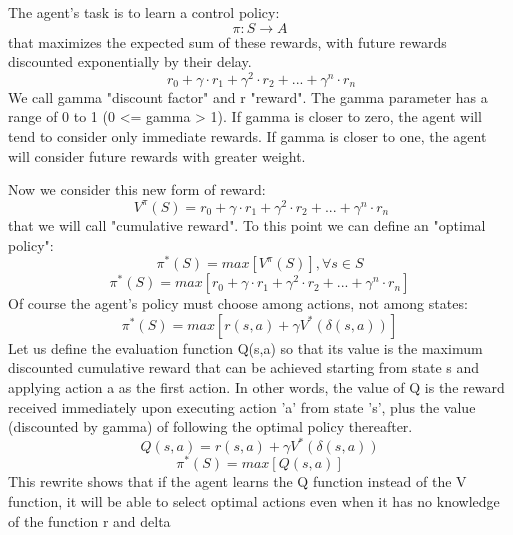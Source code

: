 \documentclass[a4paper]{article}
\begin{document}
The agent's task is to learn a control policy:
\begin{equation}
\pi : S \rightarrow A
\end{equation}
that maximizes the expected sum of these rewards, with future rewards discounted exponentially by their delay.
\begin{equation}
\ r_{0}+\gamma\cdot r_{1}+\gamma^{2}\cdot r_{2}+ ... +\gamma^{n}\cdot r_{n}
\end{equation}
We call gamma "discount factor" and r "reward". 
The gamma parameter has a range of 0 to 1 (0 <= gamma > 1). If gamma is closer to zero, the agent will tend to consider only immediate rewards. If gamma is closer to one, the agent will consider future rewards with greater weight.

Now we consider this new form of reward:
\begin{equation}
\ V^{\pi}(S)=r_{0}+\gamma\cdot r_{1}+\gamma^{2}\cdot r_{2}+ ... +\gamma^{n}\cdot r_{n}
\end{equation}
that we will call "cumulative reward". To this point we can define an "optimal policy":
\begin{equation}
\pi^{*}(S)=max[ V^{\pi}(S)], \forall s \in S
\end{equation}
\begin{equation}
\pi^{*}(S)=max[ r_{0}+\gamma\cdot r_{1}+\gamma^{2}\cdot r_{2}+ ... +\gamma^{n}\cdot r_{n}]
\end{equation}
Of course the agent's policy must choose among actions, not among states:
\begin{equation}
\pi^{*}(S)=max[ r(s,a)+ \gamma V^{*}(\delta (s,a))]
\end{equation}
Let us define the evaluation function Q(s,a) so that its value is the maximum discounted cumulative reward that can be achieved starting from state s and applying action a as the first action. In other words, the value of Q is the reward received immediately upon executing action 'a' from state 's', plus the value (discounted by gamma) of following the optimal policy thereafter.
\begin{equation}
Q(s, a)=r(s, a) + \gamma V^{*}(\delta (s,a))
\end{equation}
\begin{equation}
\pi^{*}(S)=max[Q(s,a)]
\end{equation}
This rewrite shows that if the agent learns the Q function instead of the V function, it will be able to select optimal actions even when it has no knowledge of the function r and delta
\end{document}
